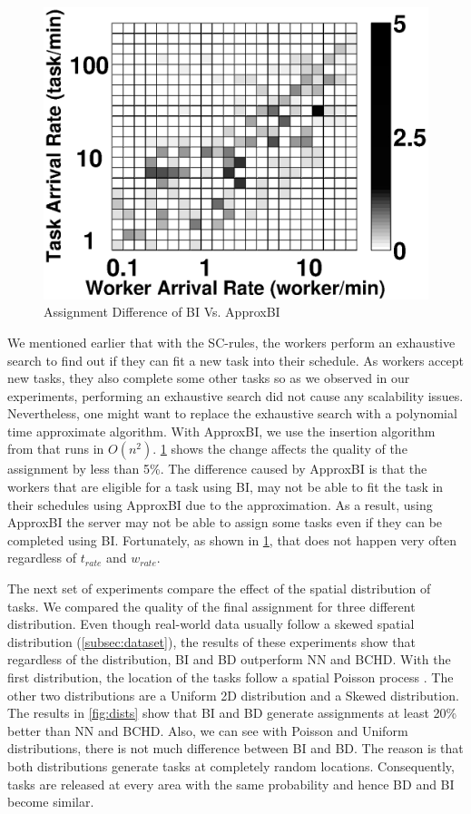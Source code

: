 \begin{figure}[h]
	\centering
	\includegraphics[width = 0.75\columnwidth]{figures/bi_abi.eps}
	\vspace{-0.1in}
	\caption{Assignment Difference of BI Vs. ApproxBI}\label{fig:bi_abi}
\end{figure}

We mentioned earlier that with the SC-rules, the workers perform an exhaustive search to find out if they can fit a new task into their schedule. As workers accept new tasks, they also complete some other tasks so as we observed in our experiments, performing an exhaustive search did not cause any scalability issues. Nevertheless, one might want to replace the exhaustive search with a polynomial time approximate algorithm. With ApproxBI, we use the insertion algorithm from \cite{Rosenkrantz74} that runs in $O(n^2)$. \cref{fig:bi_abi} shows the change affects the quality of the assignment by less than 5\%. The difference caused by ApproxBI is that the workers that are eligible for a task using BI, may not be able to fit the task in their schedules using ApproxBI due to the approximation. As a result, using ApproxBI the server may not be able to assign some tasks even if they can be completed using BI. Fortunately, as shown in \cref{fig:bi_abi}, that does not happen very often regardless of $t_{rate}$ and $w_{rate}$.

The next set of experiments compare the effect of the spatial distribution of tasks. We compared the quality of the final assignment for three different distribution. Even though real-world data usually follow a skewed spatial distribution (\cref{subsec:dataset}), the results of these experiments show that regardless of the distribution, BI and BD outperform NN and BCHD. With the first distribution, the location of the tasks follow a spatial Poisson process \cite{Baddeley07}. The other two distributions are a Uniform 2D distribution and a Skewed distribution. The results in \cref{fig:dists} show that BI and BD generate assignments at least 20\% better than NN and BCHD. Also, we can see with Poisson and Uniform distributions, there is not much difference between BI and BD. The reason is that both distributions generate tasks at completely random locations. Consequently, tasks are released at every area with the same probability and hence BD and BI become similar.


